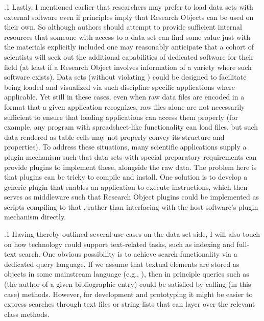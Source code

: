 \documentclass[11pt, twocolumn]{article}
\begin{document}
\p.1{%
Lastly, I mentioned earlier that researchers may prefer to
load data sets with external software even if  principles
imply that Research Objects can be used on their own.
So \mdash{} although authors should attempt to provide sufficient
internal resources that someone with access to a data set
can find some value just with the materials explicitly
included \mdash{} one may reasonably anticipate that a cohort of scientists will
seek out the additional capabilities of dedicated
software for their field (at least if a Research Object
involves information of a variety where such software exists).
Data sets (without violating ) could be
designed to facilitate being loaded and visualized
via such discipline-specific applications where applicable.
Yet still in these cases, even when
raw data files are encoded in a format that a given
application recognizes, raw files alone are
not necessarily sufficient to ensure
that loading applications can access them properly (for example,
any program with spreadsheet-like functionality can load
 files, but such data rendered as table cells
may not properly convey its structure and properties).
To address these situations, many scientific applications
supply a plugin mechanism such that data sets with
special preparatory requirements can provide plugins
to implement these, alongside the raw data. The problem
here is that plugins can be tricky to compile and install.
One solution is to develop a generic plugin that enables
an application to execute  instructions, which then
serves as middleware such that Research Object plugins
could be implemented as scripts compiling to that , rather
than interfacing with the host software's plugin mechanism directly.
}%

\p.1{%
Having thereby outlined several use cases on the data-set side,
I will also touch on how  technology could support text-related
tasks, such as indexing and full-text search. One obvious
possibility is to achieve search functionality via a
dedicated query language. If we assume that textual elements
are stored as objects in some mainstream language (e.g.,
), then in principle queries such as  (the author of a given bibliographic entry)
could be satisfied by calling (in this case)  methods.
However, for development and prototyping it might be
easier to express searches through text files or string-lists
that can layer over the relevant class methods.
}%
\end{document}
